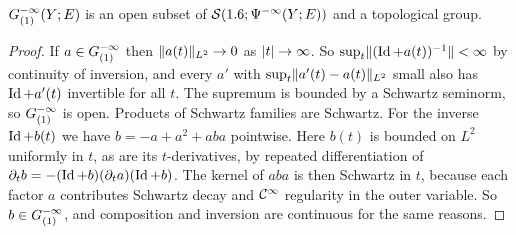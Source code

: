 \begin{lemma}\label{index:lem:loop-group}
  $G^{-\infty}_{(1)}(Y;E)$ is an open subset of $\mathcal{S}(1.6;\Psi^{-\infty}(Y;E))$ and a
  topological group.
\end{lemma}
\begin{proof}
  If $a\in G^{-\infty}_{(1)}$ then $\lVert a(t)\rVert_{L^2}\to0$ as $\lvert t\rvert\to\infty$. So
  $\sup_t\lVert (\operatorname{Id}+a(t))^{-1}\rVert<\infty$ by continuity of inversion, and every
  $a'$ with $\sup_t\lVert a'(t)-a(t)\rVert_{L^2}$ small also has $\operatorname{Id}+a'(t)$
  invertible for all $t$. The supremum is bounded by a Schwartz seminorm, so
  $G^{-\infty}_{(1)}$ is open. Products of Schwartz families are Schwartz. For the
  inverse $\operatorname{Id}+b(t)$ we have $b=-a+a^2+aba$ pointwise. Here $b(t)$ is bounded
  on $L^2$ uniformly in $t$, as are its $t$-derivatives, by repeated
  differentiation of $\partial_tb=-(\operatorname{Id}+b)(\partial_ta)(\operatorname{Id}+b)$. The kernel of
  $aba$ is then Schwartz in $t$, because each factor $a$ contributes Schwartz
  decay and $\mathcal{C}^\infty$ regularity in the outer variable. So $b\in G^{-\infty}_{(1)}$, and
  composition and inversion are continuous for the same reasons.
\end{proof}

